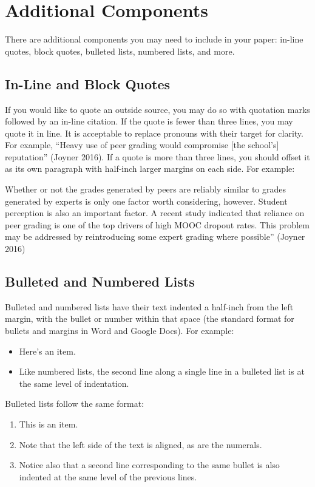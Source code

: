 {{{{\section*{Additional Components}
There are additional components you may need to include in your paper: in-line
quotes, block quotes, bulleted lists, numbered lists, and more.

\subsection*{In-Line and Block Quotes}
If you would like to quote an outside source, you may do so with quotation marks
followed by an in-line citation. If the quote is fewer than three lines, you may
quote it in line. It is acceptable to replace pronouns with their target for
clarity. For example, ``Heavy use of peer grading would compromise [the
school's] reputation'' (Joyner 2016). If a quote is more than three lines, you
should offset it as its own paragraph with half-inch larger margins on each
side. For example:

\begin{quoting}
Whether or not the grades generated by peers are reliably similar to grades
generated by experts is only one factor worth considering, however. Student
perception is also an important factor. A recent study indicated that reliance
on peer grading is one of the top drivers of high MOOC dropout rates. This
problem may be addressed by reintroducing some expert grading where possible''
(Joyner 2016)
\end{quoting}

\subsection*{Bulleted and Numbered Lists}
Bulleted and numbered lists have their text indented a half-inch from the left
margin, with the bullet or number within that space (the standard format for
bullets and margins in Word and Google Docs). For example:
%
\begin{itemize}
\item
  Here's an item.

\item
  Like numbered lists, the second line along a single line in a bulleted list is
  at the same level of indentation.
\end{itemize}

Bulleted lists follow the same format:
%
\begin{enumerate}
\item
  This is an item.
\item
  Note that the left side of the text is aligned, as are the numerals.
\item
  Notice also that a second line corresponding to the same bullet is also
  indented at the same level of the previous lines.
\end{enumerate}

}}}}
